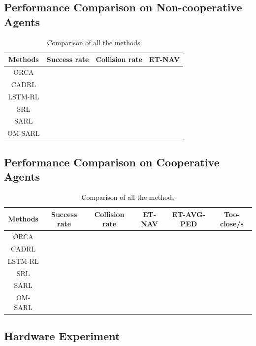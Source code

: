 \documentclass[letterpaper, 10 pt, conference]{ieeeconf}  %
\begin{document}
\subsection{Performance Comparison on Non-cooperative Agents}


\begin{table}[h]
\caption{Comparison of all the methods}
\label{table_example}
\begin{center}
\begin{tabular}{|c||c|c|c|}
\hline
Methods & Success rate & Collision rate & ET-NAV\\
\hline
ORCA &  &  &\\
\hline
CADRL &  &  &\\
\hline
LSTM-RL &  &  &\\
\hline
SRL &  &  &\\
\hline
SARL &  &  &\\
\hline
OM-SARL &  &  &\\
\hline
\end{tabular}
\end{center}
\end{table}



\subsection{Performance Comparison on Cooperative Agents}

\begin{table}[h]
\caption{Comparison of all the methods}
\label{table_example}
\begin{center}
\begin{tabular}{|c||c|c|c|c|c|}
\hline
Methods & Success rate & Collision rate & ET-NAV & ET-AVG-PED & Too-close/s\\
\hline
ORCA &  &  & & & \\
\hline
CADRL &  &  & &  &\\
\hline
LSTM-RL &  &  & & &\\
\hline
SRL &  &  & & &\\
\hline
SARL &  & & & &\\
\hline
OM-SARL  &  & & & &\\
\hline
\end{tabular}
\end{center}
\end{table}


\subsection{Hardware Experiment}
\end{document}
